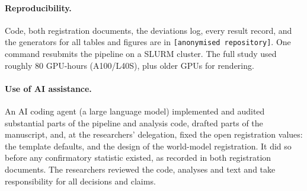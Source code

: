 \documentclass[10pt]{article}
\newcommand{\repo}{\texttt{[anonymised repository]}}
\begin{document}
\paragraph{Reproducibility.} Code, both registration documents, the deviations log,
every result record, and the generators for all tables and figures are in \repo. One
command resubmits the pipeline on a SLURM cluster. The full study used roughly 80
GPU-hours (A100/L40S), plus older GPUs for rendering.

\paragraph{Use of AI assistance.} An AI coding agent (a large language model)
implemented and audited substantial parts of the pipeline and analysis code, drafted
parts of the manuscript, and, at the researchers' delegation, fixed the open
registration values: the template defaults, and the design of the world-model
registration. It did so before any confirmatory statistic existed, as recorded in both
registration documents. The researchers reviewed the code, analyses and text and take
responsibility for all decisions and claims.

\small


\end{document}
